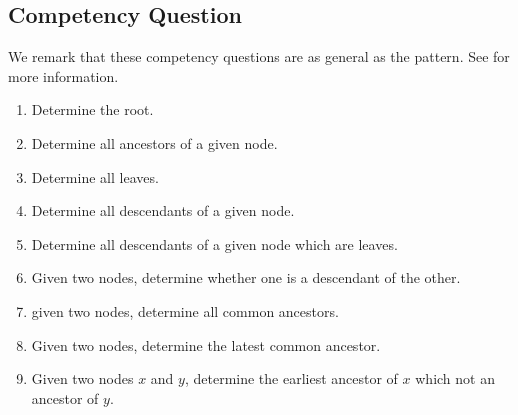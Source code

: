 \subsection{Competency Question}
\label{cqs:Tree}
We remark that these competency questions are as general as the pattern. See \cite{tree} for more information.
\begin{enumerate}[CQ1.]
\item Determine the root.
\item Determine all ancestors of a given node.
\item Determine all leaves.
\item Determine all descendants of a given node.
\item Determine all descendants of a given node which are leaves.
\item Given two nodes, determine whether one is a descendant of the other.
\item given two nodes, determine all common ancestors.
\item Given two nodes, determine the latest common ancestor.
\item Given two nodes $x$ and $y$, determine the earliest ancestor of $x$ which not an ancestor of $y$.
\end{enumerate}

\newpage
